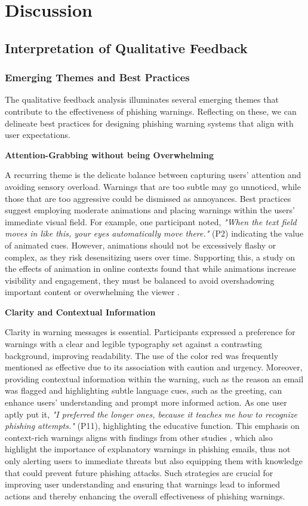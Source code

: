 \documentclass[
  a4paper,  %
  twoside,  %
  bibliography=totoc,
  headsepline,
  cleardoublepage=empty,
  parskip=half,
  draft=false
]{scrbook}
\begin{document}
\chapter{Discussion}
\section{Interpretation of Qualitative Feedback}
\subsection{Emerging Themes and Best Practices}
The qualitative feedback analysis illuminates several emerging themes that contribute to the effectiveness of phishing warnings. Reflecting on these, we can delineate best practices for designing phishing warning systems that align with user expectations.

\textbf{Attention-Grabbing without being Overwhelming}

A recurring theme is the delicate balance between capturing users’ attention and avoiding sensory overload. Warnings that are too subtle may go unnoticed, while those that are too aggressive could be dismissed as annoyances. Best practices suggest employing moderate animations and placing warnings within the users' immediate visual field. For example, one participant noted, \textit{"When the text field moves in like this, your eyes automatically move there."} (P2) indicating the value of animated cues. However, animations should not be excessively flashy or complex, as they risk desensitizing users over time. Supporting this, a study on the effects of animation in online contexts found that while animations increase visibility and engagement, they must be balanced to avoid overshadowing important content or overwhelming the viewer \cite{cheung}.

\textbf{Clarity and Contextual Information}

Clarity in warning messages is essential. Participants expressed a preference for warnings with a clear and legible typography set against a contrasting background, improving readability. The use of the color red was frequently mentioned as effective due to its association with caution and urgency. \newline 
Moreover, providing contextual information within the warning, such as the reason an email was flagged and highlighting subtle language cues, such as the greeting, can enhance users’ understanding and prompt more informed action. As one user aptly put it, \textit{"I preferred the longer ones, because it teaches me how to recognize phishing attempts."} (P11), highlighting the educative function. \newline
This emphasis on context-rich warnings aligns with findings from other studies \cite{buono, aneke}, which also highlight the importance of explanatory warnings in phishing emails, thus not only alerting users to immediate threats but also equipping them with knowledge that could prevent future phishing attacks. Such strategies are crucial for improving user understanding and ensuring that warnings lead to informed actions and thereby enhancing the overall effectiveness of phishing warnings.
\end{document}
